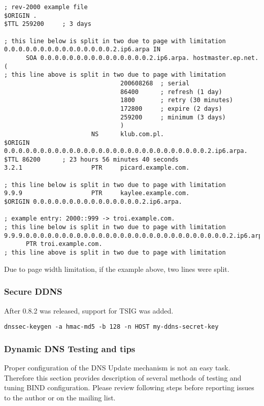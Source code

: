 \begin{lstlisting}
; rev-2000 example file
$ORIGIN .
$TTL 259200     ; 3 days

; this line below is split in two due to page with limitation
0.0.0.0.0.0.0.0.0.0.0.0.0.0.0.2.ip6.arpa IN
      SOA 0.0.0.0.0.0.0.0.0.0.0.0.0.0.0.2.ip6.arpa. hostmaster.ep.net. (
; this line above is split in two due to page with limitation
                                200608268  ; serial
                                86400      ; refresh (1 day)
                                1800       ; retry (30 minutes)
                                172800     ; expire (2 days)
                                259200     ; minimum (3 days)
                                )
                        NS      klub.com.pl.
$ORIGIN 0.0.0.0.0.0.0.0.0.0.0.0.0.0.0.0.0.0.0.0.0.0.0.0.0.0.0.0.2.ip6.arpa.
$TTL 86200      ; 23 hours 56 minutes 40 seconds
3.2.1                   PTR     picard.example.com.

; this line below is split in two due to page with limitation
9.9.9                   PTR     kaylee.example.com.
$ORIGIN 0.0.0.0.0.0.0.0.0.0.0.0.0.0.0.2.ip6.arpa.

; example entry: 2000::999 -> troi.example.com.
; this line below is split in two due to page with limitation
9.9.9.0.0.0.0.0.0.0.0.0.0.0.0.0.0.0.0.0.0.0.0.0.0.0.0.0.0.0.0.2.ip6.arpa
      PTR troi.example.com.
; this line above is split in two due to page with limitation
\end{lstlisting}
\Note Due to page width limitation, if the example above, two lines were
split.

\subsubsection{Secure DDNS}

After 0.8.2 was released, support for TSIG was added.

\begin{lstlisting}
dnssec-keygen -a hmac-md5 -b 128 -n HOST my-ddns-secret-key
\end{lstlisting}

\subsubsection{Dynamic DNS Testing and tips}
Proper configuration of the DNS Update mechanism is not an easy
task. Therefore this section provides description of several methods of
testing and tuning BIND configuration. Please review following steps
before reporting issues to the author or on the mailing list.

